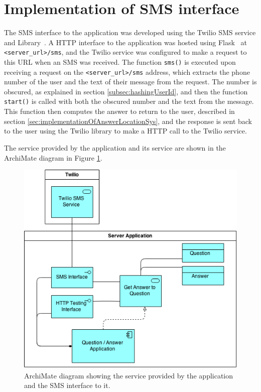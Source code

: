 \documentclass[authoryearcitations]{UoYCSproject}
\begin{document}
\section{Implementation of SMS interface}
The SMS interface to the application was developed using the Twilio SMS service and Library~\cite{serviceTwilio, libraryTwilio}. A HTTP interface to the application was hosted using Flask~\cite{libraryFlask} at \texttt{<server\_url>/sms}, and the Twilio service was configured to make a request to this URL when an SMS was received. The function \texttt{sms()} is executed upon receiving a request on the \texttt{<server\_url>/sms} address, which extracts the phone number of the user and the text of their message from the request. The number is obscured, as explained in section \ref{subsec:hashingUserId}, and then the function \texttt{start()} is called with both the obscured number and the text from the message. This function then computes the answer to return to the user, described in section \ref{sec:implementationOfAnswerLocationSys}, and the response is sent back to the user using the Twilio library to make a HTTP call to the Twilio service.

The service provided by the application and its service are shown in the ArchiMate diagram in Figure \ref{fig:systemSmsInterface}.

\begin{figure}[htb] 
\centerline{\includegraphics[width=0.8\linewidth]{systemSmsInterface}}
\caption{ArchiMate diagram showing the service provided by the application and the SMS interface to it.}
\label{fig:systemSmsInterface}
\end{figure}
\end{document}
